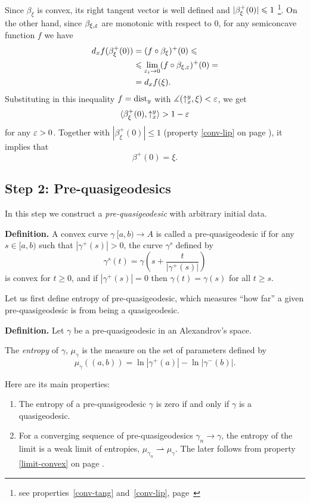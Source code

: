 \documentclass{article}
\begin{document}
Since $\beta_\xi$ is convex, its right tangent vector is well defined and
$|\beta^+_\xi(0)|\z\le 1$%
\footnote{see properties~\ref{conv-tang}
and~\ref{conv-lip}, page~\pageref{conv-tang}}.
On the other hand, since $\beta_{\xi,\varepsilon}$ are monotonic with respect to $0$, for any semiconcave function $f$
we have 
\begin{align*}
d_x f(\beta^+_{\xi}(0))
&=
(f\circ\beta_{\xi})^+(0)\leqslant
\\
&\leqslant
\lim_{\varepsilon_i\to0}(f\circ\beta_{\xi,\varepsilon})^+(0)=
\\
&=d_x f(\xi). \end{align*}
Substituting in this inequality $f=\operatorname{dist}_{y}$ with
$\measuredangle(\uparrow_x^{y},\xi)<\varepsilon$, we get $$\langle\beta^+_\xi(0),\uparrow_x^{y}\rangle  >
 1-\varepsilon$$
for any $\varepsilon>0$. 
Together with $|\beta^+_\xi(0)|\le 1$ (property \ref{conv-lip} on page
\pageref{conv-lip}), it implies that 
$$\beta^+(0)=\xi.$$
\qedsf











\subsection{Step 2: Pre-quasigeodesics} \label{step2}

In this step we construct a
\emph{pre-quasigeodesic} with arbitrary initial data.


\begin{thm}{\bf Definition.} 
A convex curve $\gamma\:[a,b) \rightarrow A$ is called a pre-quasigeodesic if for
any $s\in [a,b)$ such that ${|\gamma^+(s)|}>0$, the curve $\gamma^s$ defined by
$$\gamma^s(t)=\gamma\left(s+\frac{t}{|\gamma^+(s)|}\right)$$
is convex for $t\ge0$, and if ${|\gamma^+(s)|}=0$ then $\gamma(t)=\gamma(s)$ for
all $t\ge s$.
\end{thm}

Let us first define entropy of pre-quasigeodesic, which measures ``how far'' a given
pre-quasigeodesic is from being a quasigeodesic.

\begin{thm}{\bf Definition.}\label{def:entropy}
Let $\gamma$ be a pre-quasigeodesic in an Alexandrov's space.

The \emph{entropy} of $\gamma$, $\mu_\gamma$ is the measure on the set of parameters
defined by
$$ \mu_\gamma ((a,b))=\ln |\gamma^+(a)|-\ln |\gamma^-(b)|.$$
\end{thm}
\noi Here are its main properties:
\begin{enumerate}
\item The entropy of a pre-quasigeodesic $\gamma$ is zero if and only if $\gamma$
is a quasigeodesic. 
\item\label{lim-entropy} For a converging sequence of pre-quasigeodesics
$\gamma_n\to \gamma$, the entropy of the limit is a weak limit of entropies,
$\mu_{\gamma_n}\rightharpoonup\mu_\gamma$. 
The later follows from property \ref{limit-convex} on page \pageref{limit-convex}. 
\end{enumerate}
\end{document}
